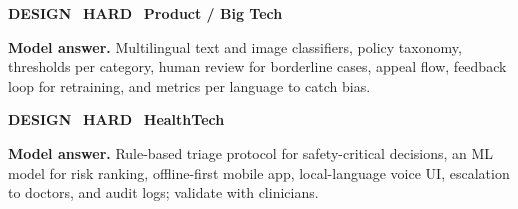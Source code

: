 \begin{tcolorbox}[enhanced,breakable,colback=white,colframe=crimson,arc=2mm,boxrule=0.8pt,left=3mm,right=3mm,
 title={\textbf{QV.10}\quad Design a content-moderation system for a social platform in Indian languages.},fonttitle=\color{white}\small,colbacktitle=crimson]
\colorbox{crimson!15}{\scriptsize\bfseries\color{crimson} DESIGN}\
\colorbox{crimson!15}{\scriptsize\bfseries\color{crimson} HARD}\
\colorbox{navy!8}{\scriptsize\bfseries\color{navy} Product / Big Tech}\par\smallskip
\textbf{\color{navy}Model answer.} Multilingual text and image classifiers, policy taxonomy, thresholds per category, human review for borderline cases, appeal flow, feedback loop for retraining, and metrics per language to catch bias.
\end{tcolorbox}
\begin{tcolorbox}[enhanced,breakable,colback=white,colframe=crimson,arc=2mm,boxrule=0.8pt,left=3mm,right=3mm,
 title={\textbf{QV.11}\quad Design an expert-system-plus-ML assistant for rural primary-health workers.},fonttitle=\color{white}\small,colbacktitle=crimson]
\colorbox{crimson!15}{\scriptsize\bfseries\color{crimson} DESIGN}\
\colorbox{crimson!15}{\scriptsize\bfseries\color{crimson} HARD}\
\colorbox{navy!8}{\scriptsize\bfseries\color{navy} HealthTech}\par\smallskip
\textbf{\color{navy}Model answer.} Rule-based triage protocol for safety-critical decisions, an ML model for risk ranking, offline-first mobile app, local-language voice UI, escalation to doctors, and audit logs; validate with clinicians.
\end{tcolorbox}